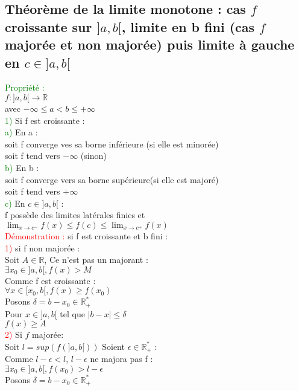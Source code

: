 \documentclass{article}
\begin{document}
\subsection{Théorème de la limite monotone : cas $f$ croissante sur $]a,b[$, limite en b fini (cas $f$ majorée et non majorée) puis limite à gauche en $c \in ]a,b[$}
\textcolor{green}{Propriété :} \\ 
$f : ]a,b[\rightarrow \mathbb{R}$ \\ 
avec $- \infty \leq a < b \leq + \infty$ \\ 
\textcolor{green}{1)} Si f est croissante : \\ 
\textcolor{green}{a)} En a : \\ 
soit f converge ves sa borne inférieure (si elle est minorée) \\ 
soit f tend vers $- \infty$ (sinon) \\ 
\textcolor{green}{b)} En b : \\ 
soit f converge vers sa borne supérieure(si elle est majoré) \\ 
soit f tend vers $+ \infty$ \\ 
\textcolor{green}{c)} En $c \in ]a,b[$ : \\ 
f possède des limites latérales finies et $\lim_{x \rightarrow c^-} f(x)\leq f(c) \leq \lim_{x \rightarrow c^+} f(x)$ \\ 
\textcolor{red}{Démonstration :} si f est croissante et b fini : \\ 
\textcolor{red}{1)} si f non majorée : \\ 
Soit $A \in \mathbb{R}$,
Ce n'est pas un majorant : \\ 
$\exists x_0 \in ]a,b[, f(x)>M$ \\ 
Comme f est croissante : \\ 
$\forall x \in [x_0,b[,f(x)\geq f(x_0)$ \\ 
Posons $ \delta = b-x_0 \in \mathbb{R}^*_+$ \\ 
Pour $x \in ]a,b[$ tel que $|b-x|\leq \delta$ \\ 
$f(x) \geq A$ \\ 
\textcolor{red}{2)} Si $f$ majorée: \\ 
Soit $l=sup(f(]a,b[))$
Soient $\epsilon \in \mathbb{R}^*_+$ : \\ 
Comme $l- \epsilon < l$, $l- \epsilon$ ne majora pas f : \\ 
$\exists x_0 \in ]a,b[,f(x_0)>l- \epsilon $ \\ 
Posons $ \delta= b-x_0 \in \mathbb{R}_+^*$ \\ 
\end{document}
